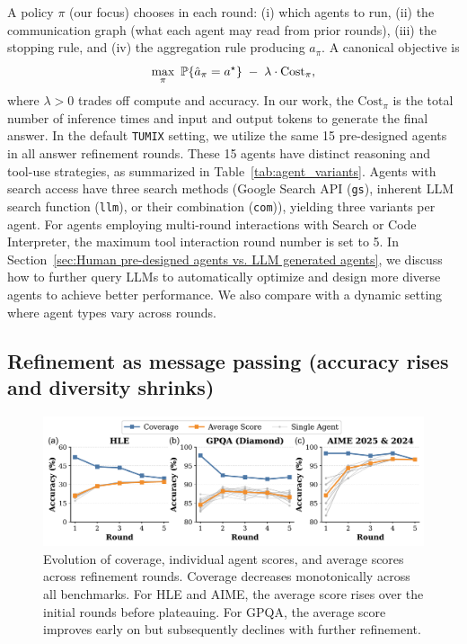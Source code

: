 A policy \(\pi\) (our focus) chooses in each round: (i) which agents to run, (ii) the communication graph (what each agent may read from prior rounds), (iii) the stopping rule, and (iv) the aggregation rule producing \(\hat a_\pi\).
A canonical objective is
\begin{equation}
  \max_{\pi}\ \Prb\{\hat a_\pi = a^\star\} \;-\; \lambda \cdot \mathrm{Cost}_\pi,
\end{equation}
where \(\lambda>0\) trades off compute and accuracy. In our work, the $\mathrm{Cost}_\pi$ is the total number of inference times and input and output tokens to generate the final answer. In the default \texttt{TUMIX} setting, we utilize the same 15 pre-designed agents in all answer refinement rounds. These 15 agents have distinct reasoning and tool-use strategies, as summarized in Table~\ref{tab:agent_variants}. Agents with search access have three search methods (Google Search API (\texttt{gs}), inherent LLM search function (\texttt{llm}), or their combination (\texttt{com})), yielding three variants per agent. For agents employing multi-round interactions with Search or Code Interpreter, the maximum tool interaction round number is set to 5. In Section~\ref{sec:Human pre-designed agents vs. LLM generated agents}, we discuss how to further query LLMs to automatically optimize and design more diverse agents to achieve better performance. We also compare with a dynamic setting where agent types vary across rounds.

\vspace{-6pt}
\subsection{Refinement as message passing (accuracy rises and diversity shrinks)}
\vspace{-6pt}
\begin{figure}[ht]
  \centering
  \includegraphics[width=0.9\linewidth]{Figures/acc_evolution_by_round.pdf}
  \vspace{-6pt}
   \caption{Evolution of coverage, individual agent scores, and average scores across refinement rounds. Coverage decreases monotonically across all benchmarks. For HLE and AIME, the average score rises over the initial rounds before plateauing. For GPQA, the average score improves early on but subsequently declines with further refinement.}
   \label{fig:acc_evolution_by_round}
   \vspace{-6pt}
\end{figure}

